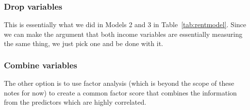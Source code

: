 \subsubsection{Drop variables}
This is essentially what we did in Models 2 and 3 in Table~\ref{tab:rentmodel}. Since we can make the argument that both income variables are essentially measuring the same thing, we just pick one and be done with it.

\subsubsection{Combine variables}
The other option is to use factor analysis (which is beyond the scope of these notes for now) to create a common factor score that combines the information from the predictors which are highly correlated. 